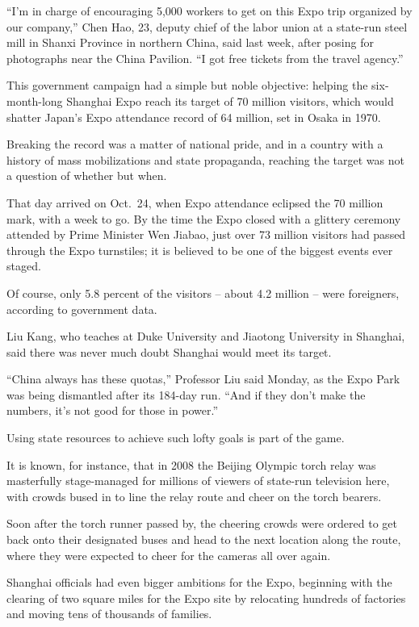 ﻿\documentclass[12pt]{article}
\begin{document}
``I'm in charge of encouraging 5,000 workers to get on this Expo trip organized by our company,''
Chen Hao, 23, deputy chief of the labor union at a state-run steel mill in Shanxi Province in
northern China, said last week, after posing for photographs near the China Pavilion. ``I got free
tickets from the travel agency.''

This government campaign had a simple but noble objective: helping the six-month-long Shanghai Expo
reach its target of 70 million visitors, which would shatter Japan's Expo attendance record of 64
million, set in Osaka in 1970.

Breaking the record was a matter of national pride, and in a country with a history of mass
mobilizations and state propaganda, reaching the target was not a question of whether but when.

That day arrived on Oct.~24, when Expo attendance eclipsed the 70 million mark, with a week to go.
By the time the Expo closed with a glittery ceremony attended by Prime Minister Wen Jiabao, just
over 73 million visitors had passed through the Expo turnstiles; it is believed to be one of the
biggest events ever staged.

Of course, only 5.8 percent of the visitors -- about 4.2 million -- were foreigners, according to
government data.

Liu Kang, who teaches at Duke University and Jiaotong University in Shanghai, said there was never
much doubt Shanghai would meet its target.

``China always has these quotas,'' Professor Liu said Monday, as the Expo Park was being dismantled
after its 184-day run. ``And if they don't make the numbers, it's not good for those in power.''

Using state resources to achieve such lofty goals is part of the game.

It is known, for instance, that in 2008 the Beijing Olympic torch relay was masterfully
stage-managed for millions of viewers of state-run television here, with crowds bused in to line the
relay route and cheer on the torch bearers.

Soon after the torch runner passed by, the cheering crowds were ordered to get back onto their
designated buses and head to the next location along the route, where they were expected to cheer
for the cameras all over again.

Shanghai officials had even bigger ambitions for the Expo, beginning with the clearing of two square
miles for the Expo site by relocating hundreds of factories and moving tens of thousands of
families.
\end{document}
